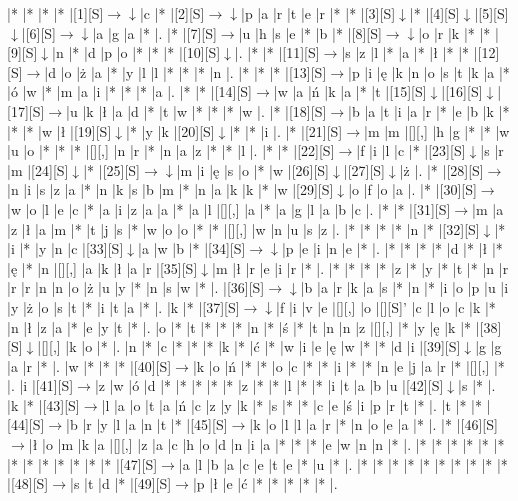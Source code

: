 \documentclass[11pt]{article}
\newcommand\drarr{$\rightarrow \!\!\!\!\! \downarrow$}
\newcommand\rarr{$\rightarrow$}
\newcommand\darr{$\downarrow$}
\begin{document}
\noindent\begin{Puzzle}{24}{24}|*	|*	|*	|*	|[1][S]\drarr	|c	|*	|[2][S]\drarr	|p	|a	|r	|t	|e	|r	|*	|*	|[3][S]\darr	|*	|[4][S]\darr	|[5][S]\darr	|[6][S]\drarr	|a	|g	|a	|*	|.
|*	|[7][S]\rarr	|u	|h	|s	|e	|*	|b	|*	|[8][S]\drarr	|o	|r	|k	|*	|*	|[9][S]\darr	|n	|*	|d	|p	|o	|*	|*	|*	|[10][S]\darr	|.
|*	|*	|[11][S]\rarr	|s	|z	|l	|*	|a	|*	|ł	|*	|*	|[12][S]\rarr	|d	|o	|ż	|a	|*	|y	|l	|l	|*	|*	|*	|n	|.
|*	|*	|*	|[13][S]\rarr	|p	|i	|ę	|k	|n	|o	|s	|t	|k	|a	|*	|ó	|w	|*	|m	|a	|i	|*	|*	|*	|a	|.
|*	|*	|[14][S]\rarr	|w	|a	|ń	|k	|a	|*	|t	|[15][S]\darr	|[16][S]\darr	|[17][S]\rarr	|u	|k	|ł	|a	|d	|*	|t	|w	|*	|*	|*	|w	|.
|*	|[18][S]\rarr	|b	|a	|t	|i	|a	|r	|*	|e	|b	|k	|*	|*	|*	|w	|ł	|[19][S]\darr	|*	|y	|k	|[20][S]\darr	|*	|*	|i	|.
|*	|[21][S]\rarr	|m	|m	|[][,]{ }	|h	|g	|*	|*	|w	|u	|o	|*	|*	|*	|[][,]{ }	|n	|r	|*	|n	|a	|z	|*	|*	|l	|.
|*	|*	|[22][S]\rarr	|f	|i	|l	|c	|*	|[23][S]\darr	|s	|r	|m	|[24][S]\darr	|*	|[25][S]\drarr	|m	|i	|ę	|s	|o	|*	|w	|[26][S]\darr	|[27][S]\darr	|ż	|.
|*	|[28][S]\rarr	|n	|i	|s	|z	|a	|*	|n	|k	|s	|b	|m	|*	|n	|a	|k	|k	|*	|w	|[29][S]\darr	|o	|f	|o	|a	|.
|*	|[30][S]\rarr	|w	|o	|l	|e	|c	|*	|a	|i	|z	|a	|a	|*	|a	|l	|[][,]{ }	|a	|*	|a	|g	|l	|a	|b	|c	|.
|*	|*	|[31][S]\rarr	|m	|a	|z	|ł	|a	|m	|*	|t	|j	|s	|*	|w	|o	|o	|*	|*	|[][,]{ }	|w	|n	|u	|s	|z	|.
|*	|*	|*	|*	|n	|*	|[32][S]\darr	|*	|i	|*	|y	|n	|c	|[33][S]\darr	|a	|w	|b	|*	|[34][S]\drarr	|p	|e	|i	|n	|e	|*	|.
|*	|*	|*	|*	|d	|*	|ł	|*	|ę	|*	|n	|[][,]{ }	|a	|k	|ł	|a	|r	|[35][S]\darr	|m	|ł	|r	|e	|i	|r	|*	|.
|*	|*	|*	|*	|z	|*	|y	|*	|t	|*	|n	|r	|r	|r	|n	|n	|o	|ż	|u	|y	|*	|n	|s	|w	|*	|.
|[36][S]\drarr	|b	|a	|r	|k	|a	|s	|*	|n	|*	|i	|o	|p	|u	|i	|y	|ż	|o	|s	|t	|*	|i	|t	|a	|*	|.
|k	|*	|[37][S]\drarr	|f	|i	|v	|e	|[][,]{ }	|o	|[][S]'	|c	|l	|o	|c	|k	|*	|n	|ł	|z	|a	|*	|e	|y	|t	|*	|.
|o	|*	|t	|*	|*	|*	|n	|*	|ś	|*	|t	|n	|n	|z	|[][,]{ }	|*	|y	|ę	|k	|*	|[38][S]\darr	|[][,]{ }	|k	|o	|*	|.
|n	|*	|c	|*	|*	|*	|k	|*	|ć	|*	|w	|i	|e	|ę	|w	|*	|*	|d	|i	|[39][S]\darr	|g	|g	|a	|r	|*	|.
|w	|*	|*	|*	|[40][S]\rarr	|k	|o	|ń	|*	|*	|o	|c	|*	|*	|i	|*	|*	|n	|e	|j	|a	|r	|*	|[][,]{ }	|*	|.
|i	|[41][S]\rarr	|z	|w	|ó	|d	|*	|*	|*	|*	|*	|z	|*	|*	|l	|*	|*	|i	|t	|a	|b	|u	|[42][S]\darr	|s	|*	|.
|k	|*	|[43][S]\rarr	|l	|a	|o	|t	|a	|ń	|c	|z	|y	|k	|*	|s	|*	|*	|c	|e	|ś	|i	|p	|r	|t	|*	|.
|t	|*	|*	|[44][S]\rarr	|b	|r	|y	|l	|a	|n	|t	|*	|[45][S]\rarr	|k	|o	|l	|l	|a	|r	|*	|n	|o	|e	|a	|*	|.
|*	|[46][S]\rarr	|ł	|o	|m	|k	|a	|[][,]{ }	|z	|a	|c	|h	|o	|d	|n	|i	|a	|*	|*	|*	|e	|w	|n	|n	|*	|.
|*	|*	|*	|*	|*	|*	|*	|*	|*	|*	|*	|*	|*	|[47][S]\rarr	|a	|l	|b	|a	|c	|e	|t	|e	|*	|u	|*	|.
|*	|*	|*	|*	|*	|*	|*	|*	|*	|*	|[48][S]\rarr	|s	|t	|d	|*	|[49][S]\rarr	|p	|ł	|e	|ć	|*	|*	|*	|*	|*	|.\end{Puzzle}
\end{document}
